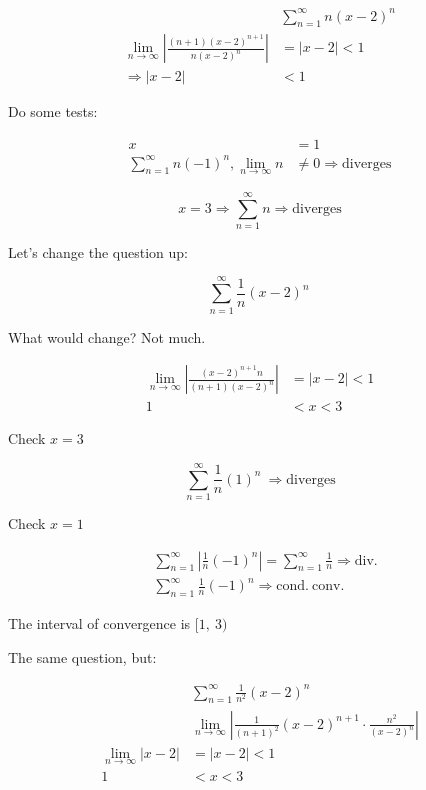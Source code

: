 \documentclass[12pt]{article}
\theoremstyle{plain}
\theoremstyle{remark}
\theoremstyle{definition}
\begin{document}
\begin{align*}
&\sum_{n = 1}^{\infty}{n(x - 2)^{n}} \\
\lim_{n \rightarrow \infty}\left| \frac{(n + 1)(x - 2)^{n + 1}}{n(x - 2)^{n}} \right| &= |x - 2| < 1 \\
\Rightarrow |x - 2| &< 1
\end{align*}


Do some tests:

\begin{align*}
x &= 1 \\
\sum_{n = 1}^{\infty}{n( - 1)^{n}},\lim_{n \rightarrow \infty}n &\neq 0 \Rightarrow \text{diverges}
\end{align*}


\[x = 3 \Rightarrow \sum_{n = 1}^{\infty}n \Rightarrow \text{diverges}\]

Let's change the question up:

\[\sum_{n = 1}^{\infty}{\frac{1}{n}(x - 2)^{n}\ }\]

What would change? Not much.

\begin{align*}
\lim_{n \rightarrow \infty}\left| \frac{(x - 2)^{n + 1}n}{(n + 1)(x - 2)^{n}} \right| &= |x - 2| < 1 \\
1 &< x < 3
\end{align*}


Check \(x = 3\)

\[\sum_{n = 1}^{\infty}{\frac{1}{n}(1)^{n}\ } \Rightarrow \text{diverges}\]

Check \(x = 1\)

\begin{align*}
&\sum_{n = 1}^{\infty}\left| \frac{1}{n}( - 1)^{n} \right| = \sum_{n = 1}^{\infty}\frac{1}{n} \Rightarrow \text{div.} \\
&\sum_{n = 1}^{\infty}{\frac{1}{n}( - 1)^{n}} \Rightarrow \text{cond.}\ \text{conv.\ }
\end{align*}


The interval of convergence is \(\lbrack 1,\ 3)\)

The same question, but:

\begin{align*}
&\sum_{n = 1}^{\infty}{\frac{1}{n^{2}}(x - 2)^{n}} \\
&\lim_{n \rightarrow \infty}\left| \frac{1}{(n + 1)^{2}}(x - 2)^{n + 1} \cdot \frac{n^{2}}{(x - 2)^{n}} \right| \\
\lim_{n \rightarrow \infty}|x - 2| &= |x - 2| < 1 \\
1 &< x < 3
\end{align*}
\end{document}
